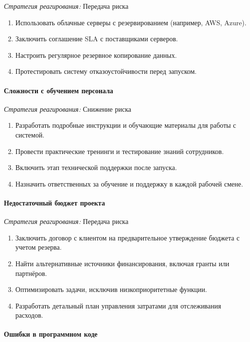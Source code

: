 \textit{Стратегия реагирования:} Передача риска

\begin{enumerate}
	\item Использовать облачные серверы с резервированием (например, AWS, Azure).
	\item Заключить соглашение SLA с поставщиками серверов.
	\item Настроить регулярное резервное копирование данных.
	\item Протестировать систему отказоустойчивости перед запуском.
\end{enumerate}

\paragraph{Сложности с обучением персонала}

\textit{Стратегия реагирования:} Снижение риска

\begin{enumerate}
	\item Разработать подробные инструкции и обучающие материалы для работы с системой.
	\item Провести практические тренинги и тестирование знаний сотрудников.
	\item Включить этап технической поддержки после запуска.
	\item Назначить ответственных за обучение и поддержку в каждой рабочей смене.
\end{enumerate}

\paragraph{Недостаточный бюджет проекта}

\textit{Стратегия реагирования:} Передача риска

\begin{enumerate}
	\item Заключить договор с клиентом на предварительное утверждение бюджета с учетом резерва.
	\item Найти альтернативные источники финансирования, включая гранты или партнёров.
	\item Оптимизировать задачи, исключив низкоприоритетные функции.
	\item Разработать детальный план управления затратами для отслеживания расходов.
\end{enumerate}

\paragraph{Ошибки в программном коде}

